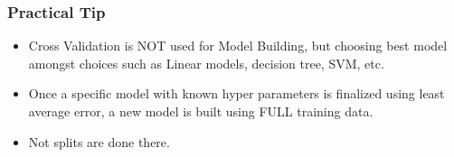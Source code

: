 \begin{frame}[fragile]\frametitle{Practical Tip}

		\begin{itemize}

			\item Cross Validation is NOT used for Model Building, but choosing best model amongst choices such as Linear models, decision tree, SVM, etc. 
			\item Once a specific model with known hyper parameters is finalized using least average error, a new model is built using FULL training data. 
			\item Not splits are done there.
					\end{itemize}
\end{frame}





